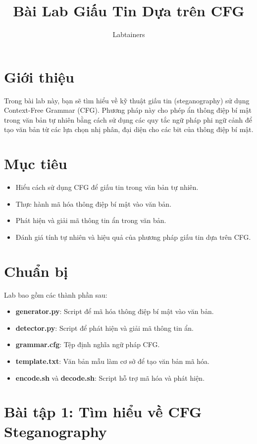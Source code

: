 \documentclass{article}
\title{Bài Lab Giấu Tin Dựa trên CFG}
\author{Labtainers}
\date{}
\begin{document}
\maketitle

\section{Giới thiệu}
Trong bài lab này, bạn sẽ tìm hiểu về kỹ thuật giấu tin (steganography) sử dụng Context-Free Grammar (CFG). Phương pháp này cho phép ẩn thông điệp bí mật trong văn bản tự nhiên bằng cách sử dụng các quy tắc ngữ pháp phi ngữ cảnh để tạo văn bản từ các lựa chọn nhị phân, đại diện cho các bit của thông điệp bí mật.

\section{Mục tiêu}
\begin{itemize}
    \item Hiểu cách sử dụng CFG để giấu tin trong văn bản tự nhiên.
    \item Thực hành mã hóa thông điệp bí mật vào văn bản.
    \item Phát hiện và giải mã thông tin ẩn trong văn bản.
    \item Đánh giá tính tự nhiên và hiệu quả của phương pháp giấu tin dựa trên CFG.
\end{itemize}

\section{Chuẩn bị}
Lab bao gồm các thành phần sau:
\begin{itemize}
    \item \textbf{generator.py}: Script để mã hóa thông điệp bí mật vào văn bản.
    \item \textbf{detector.py}: Script để phát hiện và giải mã thông tin ẩn.
    \item \textbf{grammar.cfg}: Tệp định nghĩa ngữ pháp CFG.
    \item \textbf{template.txt}: Văn bản mẫu làm cơ sở để tạo văn bản mã hóa.
    \item \textbf{encode.sh} và \textbf{decode.sh}: Script hỗ trợ mã hóa và phát hiện.
\end{itemize}

\section{Bài tập 1: Tìm hiểu về CFG Steganography}
\end{document}
